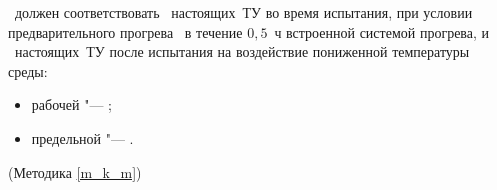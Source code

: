 \dut \ должен соответствовать \treb \ настоящих~ТУ во время испытания, при условии предварительного прогрева \dut \ в течение $0,5$~ч встроенной системой прогрева,  и \trebafter \ настоящих~ТУ после испытания на воздействие пониженной температуры среды:
%
\begin{itemize}
	\item рабочей "--- \km;
	\item предельной "--- \kmmax.
\end{itemize}

\begin{flushright}
	(Методика \ref{m_k_m})
\end{flushright}

